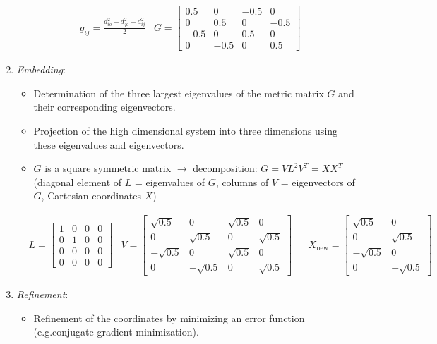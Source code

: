 \begin{enumerate}
\begin{itemize}
    \end{itemize}
    \begin{align}
        &g_{ij}=\frac{d_{io}^2+d_{jo}^2+d_{ij}^2}{2}&G=\begin{bmatrix} 0.5 & 0 & -0.5 & 0 \\ 0 & 0.5 & 0 & -0.5 \\ -0.5 & 0 & 0.5 & 0 \\ 0 & -0.5 & 0 & 0.5 \end{bmatrix}
    \end{align}
    \item \emph{Embedding}:
    \begin{itemize}
        \item Determination of the three largest eigenvalues of the metric matrix $G$ and their corresponding eigenvectors.
        \item Projection of the high dimensional system into three dimensions using these eigenvalues and eigenvectors.
        \item $G$ is a square symmetric matrix $\rightarrow$ decomposition: $G=VL^2V^T=XX^T$ (diagonal element of $L$ = eigenvalues of $G$, columns of $V$ = eigenvectors of $G$, Cartesian coordinates $X$)
    \end{itemize}
    \begin{align}
        &L=\begin{bmatrix}1&0&0&0\\0&1&0&0\\0&0&0&0\\0&0&0&0\end{bmatrix}&V=\begin{bmatrix} \sqrt{0.5} & 0 & \sqrt{0.5} & 0 \\ 0 & \sqrt{0.5} & 0 & \sqrt{0.5} \\ -\sqrt{0.5} & 0 & \sqrt{0.5} & 0 \\ 0 & -\sqrt{0.5} & 0 & \sqrt{0.5} \end{bmatrix}&&X_\mathrm{new}=\begin{bmatrix}\sqrt{0.5}&0\\0&\sqrt{0.5}\\-\sqrt{0.5}&0\\0&-\sqrt{0.5}\end{bmatrix}
    \end{align}
    \item \emph{Refinement}:
    \begin{itemize}
        \item Refinement of the coordinates by minimizing an error function (e.g.conjugate gradient minimization).

\end{itemize}
\end{enumerate}
